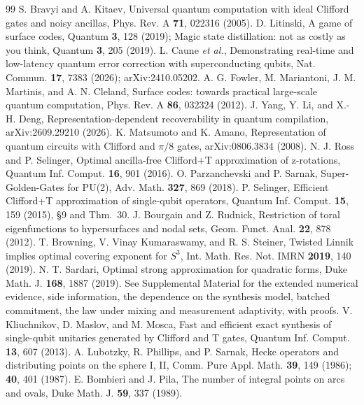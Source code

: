 \documentclass[aps,prx,twocolumn,superscriptaddress,nofootinbib,longbibliography]{revtex4-2}
\theoremstyle{plain}
\theoremstyle{definition}
\theoremstyle{remark}
\begin{document}
\begin{thebibliography}{99}
 S. Bravyi and A. Kitaev, Universal quantum computation with ideal Clifford gates and noisy ancillas, Phys. Rev. A \textbf{71}, 022316 (2005).
 D. Litinski, A game of surface codes, Quantum \textbf{3}, 128 (2019); Magic state distillation: not as costly as you think, Quantum \textbf{3}, 205 (2019).
 L. Caune \emph{et al.}, Demonstrating real-time and low-latency quantum error correction with superconducting qubits, Nat. Commun. \textbf{17}, 7383 (2026); arXiv:2410.05202.
 A. G. Fowler, M. Mariantoni, J. M. Martinis, and A. N. Cleland, Surface codes: towards practical large-scale quantum computation, Phys. Rev. A \textbf{86}, 032324 (2012).
 J. Yang, Y. Li, and X.-H. Deng, Representation-dependent recoverability in quantum compilation, arXiv:2609.29210 (2026).
 K. Matsumoto and K. Amano, Representation of quantum circuits with Clifford and $\pi/8$ gates, arXiv:0806.3834 (2008).
 N. J. Ross and P. Selinger, Optimal ancilla-free Clifford+T approximation of z-rotations, Quantum Inf. Comput. \textbf{16}, 901 (2016).
 O. Parzanchevski and P. Sarnak, Super-Golden-Gates for PU(2), Adv. Math. \textbf{327}, 869 (2018).
 P. Selinger, Efficient Clifford+T approximation of single-qubit operators, Quantum Inf. Comput. \textbf{15}, 159 (2015), \S9 and Thm.~30.
 J. Bourgain and Z. Rudnick, Restriction of toral eigenfunctions to hypersurfaces and nodal sets, Geom. Funct. Anal. \textbf{22}, 878 (2012).
 T. Browning, V. Vinay Kumaraswamy, and R. S. Steiner, Twisted Linnik implies optimal covering exponent for $S^3$, Int. Math. Res. Not. IMRN \textbf{2019}, 140 (2019).
 N. T. Sardari, Optimal strong approximation for quadratic forms, Duke Math. J. \textbf{168}, 1887 (2019).
 See Supplemental Material for the extended numerical evidence, side information, the dependence on the synthesis model, batched commitment, the law under mixing and measurement adaptivity, with proofs.
 V. Kliuchnikov, D. Maslov, and M. Mosca, Fast and efficient exact synthesis of single-qubit unitaries generated by Clifford and T gates, Quantum Inf. Comput. \textbf{13}, 607 (2013).
 A. Lubotzky, R. Phillips, and P. Sarnak, Hecke operators and distributing points on the sphere I, II, Comm. Pure Appl. Math. \textbf{39}, 149 (1986); \textbf{40}, 401 (1987).
 E. Bombieri and J. Pila, The number of integral points on arcs and ovals, Duke Math. J. \textbf{59}, 337 (1989).

\end{thebibliography}
\end{document}
